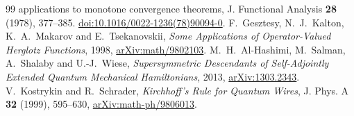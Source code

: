 \begin{thebibliography}{99}
{applications to monotone convergence theorems},
J. Functional Analysis \textbf{28} (1978), 377--385.
\href{https://doi.org/10.1016/0022-1236(78)90094-0}{doi:10.1016/0022-1236(78)90094-0}.
F.~Gesztesy, N.~J.~Kalton, K.~A.~Makarov and E.~Tsekanovskii,
\emph{Some Applications of Operator-Valued Herglotz Functions},
1998, \href{https://arxiv.org/abs/math/9802103}{arXiv:math/9802103}.
M.~H.~Al-Hashimi, M.~Salman, A.~Shalaby and U.-J.~Wiese,
\emph{Supersymmetric Descendants of Self-Adjointly Extended Quantum
Mechanical Hamiltonians},
2013, \href{https://arxiv.org/abs/1303.2343}{arXiv:1303.2343}.
V.~Kostrykin and R.~Schrader, \emph{Kirchhoff's Rule for Quantum Wires},
J. Phys. A \textbf{32} (1999), 595--630,
\href{https://arxiv.org/abs/math-ph/9806013}{arXiv:math-ph/9806013}.
\end{thebibliography}
